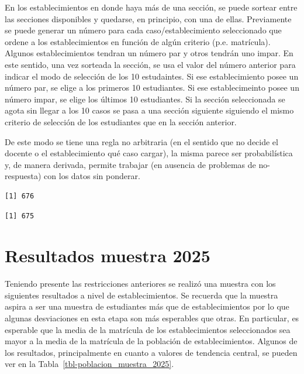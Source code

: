 \documentclass[
  spanish,
  a4paper,
]{scrreprt}
\begin{document}
En los establecimientos en donde haya más de una sección, se puede
sortear entre las secciones disponibles y quedarse, en principio, con
una de ellas. Previamente se puede generar un número para cada
caso/establecimiento seleccionado que ordene a los establecimientos en
función de algún criterio (p.e. matrícula). Algunos establecimientos
tendran un número par y otros tendrán uno impar. En este sentido, una
vez sorteada la sección, se usa el valor del número anterior para
indicar el modo de selección de los 10 estudaintes. Si ese
establecimiento posee un número par, se elige a los primeros 10
estudiantes. Si ese establecimeinto posee un número impar, se elige los
últimos 10 estudiantes. Si la sección seleccionada se agota sin llegar a
los 10 casos se pasa a una sección siguiente siguiendo el mismo criterio
de selección de los estudiantes que en la sección anterior.

De este modo se tiene una regla no arbitraria (en el sentido que no
decide el docente o el establecimiento qué caso cargar), la misma parece
ser probabilística y, de manera derivada, permite trabajar (en ausencia
de problemas de no-respuesta) con los datos sin ponderar.

\begin{verbatim}
[1] 676
\end{verbatim}

\begin{verbatim}
[1] 675
\end{verbatim}

\section{Resultados muestra 2025}\label{resultados-muestra-2025}

Teniendo presente las restricciones anteriores se realizó una muestra
con los siguientes resultados a nivel de establecimientos. Se recuerda
que la muestra aspira a ser una muestra de estudiantes más que de
establecimientos por lo que algunas desviaciones en esta etapa son más
esperables que otras. En particular, es esperable que la media de la
matrícula de los establecimientos seleccionados sea mayor a la media de
la matrícula de la población de establecimientos. Algunos de los
resultados, principalmente en cuanto a valores de tendencia central, se
pueden ver en la Tabla~\ref{tbl-poblacion_muestra_2025}.
\end{document}
